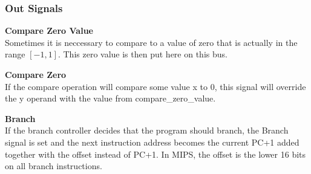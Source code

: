 \subsubsection{Out Signals}

\begin{description}
\item{\textbf{Compare Zero Value}} \\

Sometimes it is neccessary to compare to a value of zero that is actually in the range $[-1,1]$.
This zero value is then put here on this bus.

\item{\textbf{Compare Zero}} \\

If the compare operation will compare some value x to 0, this signal will override the y operand with the value from compare\_zero\_value.

\item{\textbf{Branch}} \\

If the branch controller decides that the program should branch, the Branch signal is set and the next instruction address becomes the current PC+1 added together with the offset instead of PC+1.
In MIPS, the offset is the lower 16 bits on all branch instructions.

\end{description}
